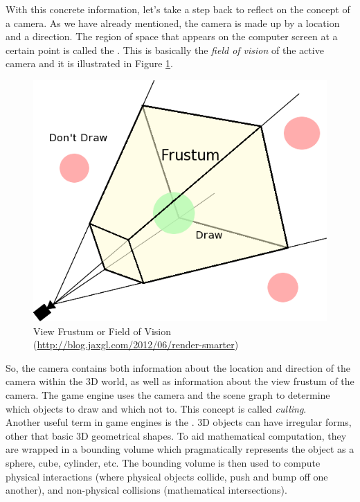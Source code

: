 With this concrete information, let's take a step back to reflect on the concept of a camera. As we have already mentioned, the camera is made up by a location and a direction. The region of space that appears on the computer screen at a certain point is called the \emph{}. This is basically the \emph{field of vision} of the active camera and it is illustrated in Figure \ref{fig:view_frustum}.\\
\begin{figure}[H]
	\centering
	\includegraphics[width=\linewidth]{gfx/Chapter3/view_frustum}
	\caption{View Frustum or Field of Vision (\url{http://blog.jaxgl.com/2012/06/render-smarter})}
	\label{fig:view_frustum}
\end{figure}

So, the camera contains both information about the location and direction of the camera within the 3D world, as well as information about the view frustum of the camera. The game engine uses the camera and the scene graph to determine which objects to draw and which not to. This concept is called \emph{culling}.\\

Another useful term in game engines is the \emph{}. 3D objects can have irregular forms, other that basic 3D geometrical shapes. To aid mathematical computation, they are wrapped in a bounding volume which pragmatically represents the object as a sphere, cube, cylinder, etc. The bounding volume is then used to compute physical interactions (where physical objects collide, push and bump off one another), and non-physical collisions (mathematical intersections).\\

